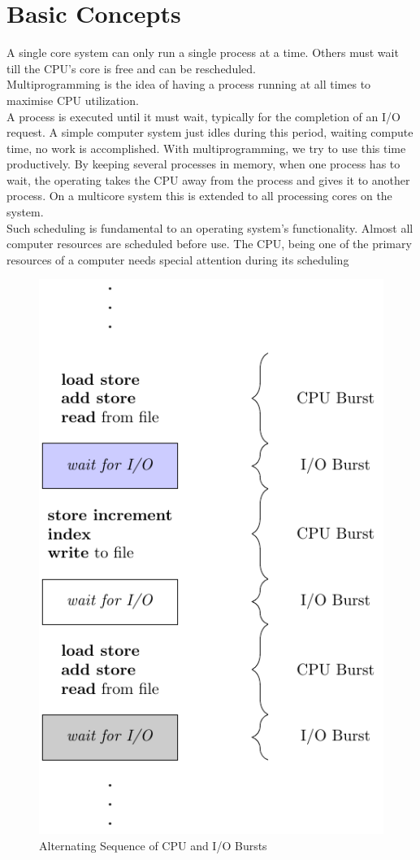\documentclass{book/custombook}
\begin{document}
        \section{Basic Concepts}
            A single core system can only run a single process at a time. Others must wait
            till the CPU's core is free and can be rescheduled.\\
            Multiprogramming is the idea of having a process running at all times to maximise
            CPU utilization.\\
            A process is executed until it must wait, typically for the completion of an I/O 
            request. A simple computer system just idles during this period, waiting compute time,
            no work is accomplished. With multiprogramming, we try to use this time productively.
            By keeping several processes in memory, when one process has to wait, the operating takes 
            the CPU away from the process and gives it to another process. On a multicore system this
            is extended to all processing cores on the system.\\
            Such scheduling is fundamental to an operating system's functionality. Almost all 
            computer resources are scheduled before use. The CPU, being one of the primary resources
            of a computer needs special attention during its scheduling
            \begin{figure}[H]
                \centering
                \includegraphics[width=0.2\linewidth]{figures/cpu_io_burst.pdf}
                \caption{Alternating Sequence of CPU and I/O Bursts}
            \end{figure}
\end{document}
